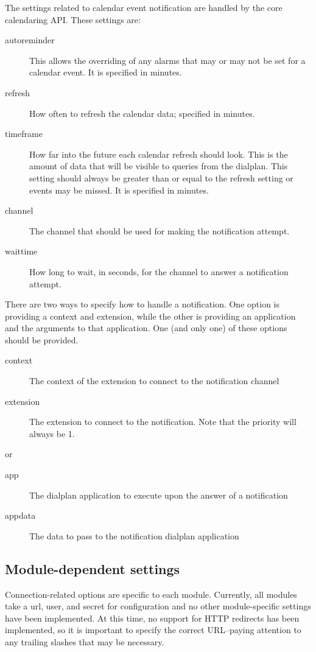 The settings related to calendar event notification are handled by the core
calendaring API. These settings are:
\begin{description}
\item[autoreminder] This allows the overriding of any alarms that may or may not
be set for a calendar event. It is specified in minutes.
\item[refresh] How often to refresh the calendar data; specified in minutes.
\item[timeframe] How far into the future each calendar refresh should look. This
is the amount of data that will be visible to queries from the dialplan. This
setting should always be greater than or equal to the refresh setting or events
may be missed. It is specified in minutes.
\item[channel] The channel that should be used for making the notification
attempt.
\item[waittime] How long to wait, in seconds, for the channel to answer a notification
attempt.
\end{description}

There are two ways to specify how to handle a notification. One option is
providing a context and extension, while the other is providing an application
and the arguments to that application. One (and only one) of these options
should be provided.

\begin{description}
\item[context] The context of the extension to connect to the notification
channel
\item[extension] The extension to connect to the notification. Note that the
priority will always be 1.
\end{description}

or

\begin{description}
\item[app] The dialplan application to execute upon the answer of a notification
\item[appdata] The data to pass to the notification dialplan application
\end{description}

\subsection{Module-dependent settings}

Connection-related options are specific to each module. Currently, all modules
take a url, user, and secret for configuration and no other module-specific
settings have been implemented. At this time, no support for HTTP redirects has
been implemented, so it is important to specify the correct URL--paying attention
to any trailing slashes that may be necessary.

